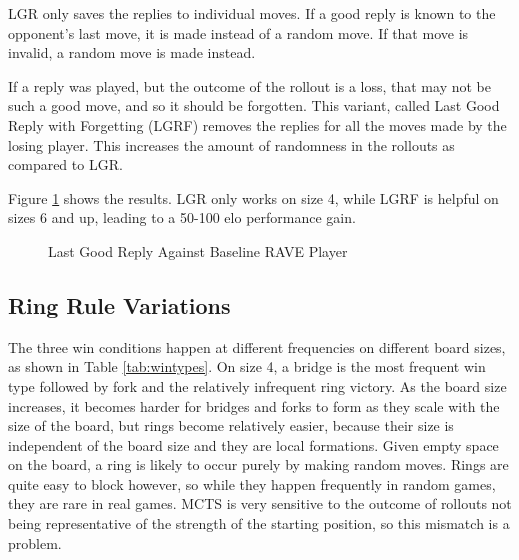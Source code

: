LGR only saves the replies to individual moves. If a good reply is known to the opponent's last move, it is made instead of a random move. If that move is invalid, a random move is made instead.

If a reply was played, but the outcome of the rollout is a loss, that may not be such a good move, and so it should be forgotten. This variant, called Last Good Reply with Forgetting (LGRF) removes the replies for all the moves made by the losing player. This increases the amount of randomness in the rollouts as compared to LGR.

Figure \ref{fig:lgr} shows the results. LGR only works on size 4, while LGRF is helpful on sizes 6 and up, leading to a 50-100 elo performance gain.

\begin{figure}
	\centering
{}
	\caption{Last Good Reply Against Baseline RAVE Player}
	\label{fig:lgr}
\end{figure}


\subsection{Ring Rule Variations}\label{sec:ringrules}

The three win conditions happen at different frequencies on different board sizes, as shown in Table \ref{tab:wintypes}. On size 4, a bridge is the most frequent win type followed by fork and the relatively infrequent ring victory. As the board size increases, it becomes harder for bridges and forks to form as they scale with the size of the board, but rings become relatively easier, because their size is independent of the board size and they are local formations. Given empty space on the board, a ring is likely to occur purely by making random moves. Rings are quite easy to block however, so while they happen frequently in random games, they are rare in real games. MCTS is very sensitive to the outcome of rollouts not being representative of the strength of the starting position, so this mismatch is a problem.

